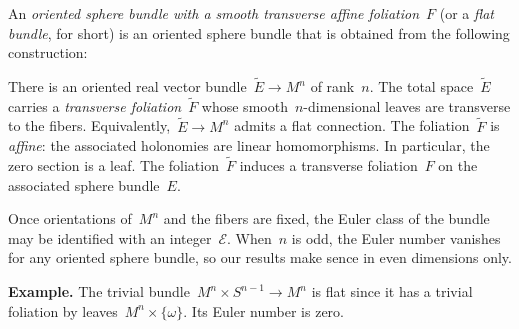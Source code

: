\documentclass[12pt]{amsart}
\theoremstyle{plain}
\theoremstyle{definition}
\theoremstyle{plain}
\theoremstyle{definition}
\begin{document}

An \textit{oriented sphere bundle with a smooth transverse affine foliation}~$F$ (or a \textit{flat bundle}, for short) is an oriented sphere bundle that is obtained from the following construction:

There is an oriented real vector bundle~$\widetilde{E}\rightarrow M^n$ of rank~$n$.
The total space~$\widetilde{E}$ carries a \textit{transverse foliation}~$\widetilde{F}$ whose smooth~$n$-dimensional leaves are transverse to the fibers. 
Equivalently,~$\widetilde{E}\rightarrow M^n$ admits a flat connection.
The foliation~$\widetilde{F}$ is \textit{affine}: {the associated holonomies} are linear homomorphisms. 
In particular, the zero section is a leaf. 
The foliation~$\widetilde{F}$ induces a transverse foliation~$F$ on the associated sphere bundle~$E$.
     
\medskip

Once orientations of~$M^n$ and the fibers are fixed, the Euler class of the bundle may be identified with an integer~$\mathcal{E}$. 
When~$n$ is odd, the Euler number vanishes for any oriented sphere bundle, so {our results make sence in even dimensions only}. 


\medskip

\textbf{Example. } The trivial bundle~$M^n\times S^{n-1}\rightarrow M^n$ is flat since it has a trivial foliation by  leaves~$M^n\times \{\omega\}$.  Its Euler number is zero.

\bigskip
\end{document}
